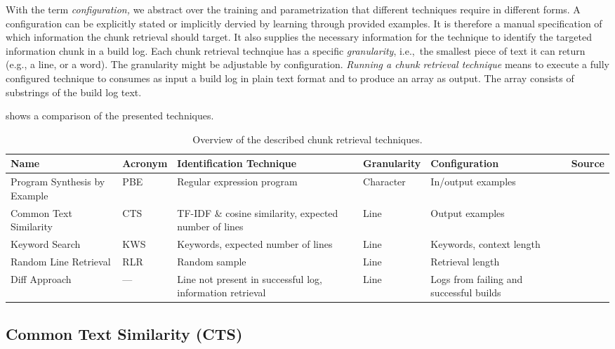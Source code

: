 With the term \textit{configuration,} we abstract over the training and parametrization that different techniques require in different forms. A configuration can be explicitly stated or implicitly dervied by learning through provided examples. It is therefore a manual specification of which information the chunk retrieval should target. It also supplies the necessary information for the technique to identify the targeted information chunk in a build log.
Each chunk retrieval technqiue has a specific \textit{granularity}, i.e.,\ the smallest piece of text it can return (e.g., a line, or a word). The granularity might be adjustable by configuration.
\emph{Running a chunk retrieval technique} means to execute a fully configured technique to consumes as input a build log in plain text format and to produce an array as output. The array consists of substrings of the build log text.

 shows a comparison of the presented techniques.

\begin{table}[]
\centering
\caption{Overview of the described chunk retrieval techniques.}
\begin{tabularx}{\textwidth}{@{}XlXlXX@{}} 
\toprule
Name                         & Acronym & Identification Technique                                   & Granularity & Configuration & Source            \\ 
\midrule
Program Synthesis by Example & PBE     & Regular expression program                                 & Character   & In/output examples      \\
Common Text Similarity       & CTS     & TF-IDF \& cosine similarity, expected number of lines & Line        & Output examples           \\
Keyword Search               & KWS     & Keywords, expected number of lines                    & Line        & Keywords, context length  \\
Random Line Retrieval        & RLR     & Random sample                                              & Line        & Retrieval length          \\
Diff Approach                & ---     & Line not present in successful log, information retrieval  & Line        & Logs from failing and successful builds      \\
\bottomrule
\end{tabularx}
\label{tab:ctr}
\end{table}

\subsection{Common Text Similarity (CTS)}
\label{sec:expl-ts}

